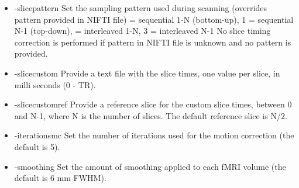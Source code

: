 \begin{itemize}

\item -slicepattern
\newline \newline Set the sampling pattern used during scanning \newline
 				  (overrides pattern provided in NIFTI file)  = sequential 1-N (bottom-up), 1 = sequential N-1 (top-down),  = interleaved 1-N, 3 = interleaved N-1 \newline \newline
                  No slice timing correction is performed if pattern in \newline
                  NIFTI file is unknown and no pattern is provided. 

\item -slicecustom
\newline \newline Provide a text file with the slice times, \newline
				  one value per slice, in milli seconds (0 - TR). \newline

\item -slicecustomref
\newline \newline Provide a reference slice for the custom slice times, \newline
				  between 0 and N-1, where N is the number of slices. \newline
				  The default reference slice is N/2.
 

\item -iterationsmc 
\newline \newline Set the number of iterations used for the \newline motion correction (the default is 5).

\item -smoothing 
\newline \newline Set the amount of smoothing applied to \newline each fMRI volume (the default is 6 mm FWHM). 

\end{itemize}

\newpage

